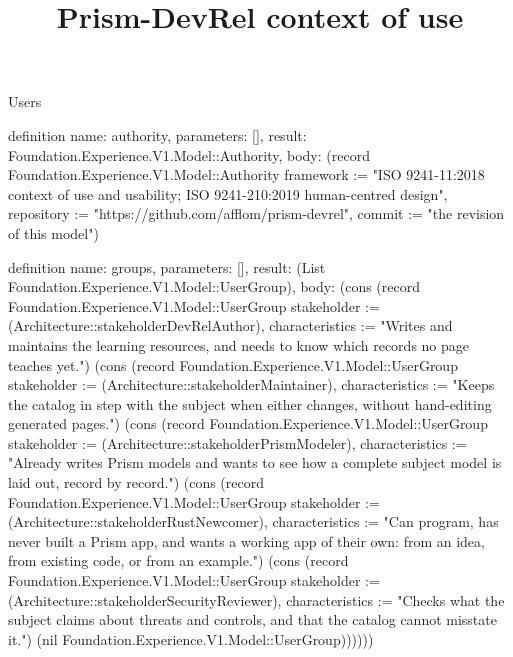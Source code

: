 \begin{lexlean}{Users}
\title{Prism-DevRel context of use}
\begin{semanticmodule}
definition{
  name: authority,
  parameters: [],
  result: Foundation.Experience.V1.Model::Authority,
  body: (record Foundation.Experience.V1.Model::Authority {framework := "ISO 9241-11:2018 context of use and usability; ISO 9241-210:2019 human-centred design", repository := "https://github.com/afflom/prism-devrel", commit := "the revision of this model"})
}

definition{
  name: groups,
  parameters: [],
  result: (List Foundation.Experience.V1.Model::UserGroup),
  body: (cons (record Foundation.Experience.V1.Model::UserGroup {stakeholder := (Architecture::stakeholderDevRelAuthor), characteristics := "Writes and maintains the learning resources, and needs to know which records no page teaches yet."}) (cons (record Foundation.Experience.V1.Model::UserGroup {stakeholder := (Architecture::stakeholderMaintainer), characteristics := "Keeps the catalog in step with the subject when either changes, without hand-editing generated pages."}) (cons (record Foundation.Experience.V1.Model::UserGroup {stakeholder := (Architecture::stakeholderPrismModeler), characteristics := "Already writes Prism models and wants to see how a complete subject model is laid out, record by record."}) (cons (record Foundation.Experience.V1.Model::UserGroup {stakeholder := (Architecture::stakeholderRustNewcomer), characteristics := "Can program, has never built a Prism app, and wants a working app of their own: from an idea, from existing code, or from an example."}) (cons (record Foundation.Experience.V1.Model::UserGroup {stakeholder := (Architecture::stakeholderSecurityReviewer), characteristics := "Checks what the subject claims about threats and controls, and that the catalog cannot misstate it."}) (nil Foundation.Experience.V1.Model::UserGroup))))))
}


\end{semanticmodule}
\end{lexlean}
